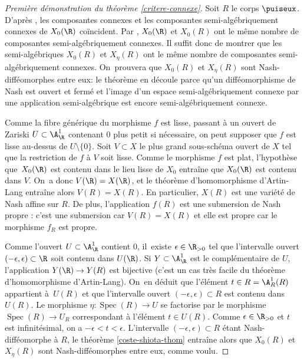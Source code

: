 \begin{proof}[Première démonstration du théorème \ref{critere-connexe}]
Soit $R$ le corps $\puiseux$. D'après \cite[Th.\,2.4.5]{bochnak1987geometrie}, les composantes connexes et les composantes semi-algébriquement connexes de $X_0(\R)$ coïncident. Par \cite[Prop.\,5.3.6]{bochnak1998real}, $X_0(\R)$ et $X_0(R)$ ont le même nombre de composantes semi-algébriquement connexes. Il suffit donc de montrer que les semi-algébriques $X_0(R)$ et $X_\eta(R)$ ont le même nombre de composantes semi-algébriquement connexes. On~prouvera que $X_0(R)$ et $X_\eta(R)$ sont Nash-difféomorphes entre eux: le théorème en découle parce qu'un difféomorphisme de Nash est ouvert et fermé et l'image d'un espace semi-algébriquement connexe par une application semi-algébrique est encore semi-algébriquement connexe.

Comme la fibre générique du morphisme $f$ est lisse, passant à un ouvert de Zariski $U\subset \A^1_{\R}$ contenant $0$ plus petit si nécessaire, on peut supposer que $f$ est lisse au-dessus de $U\setminus\{0\}$. Soit $V\subset X$ le plus grand sous-schéma ouvert de $X$ tel que la restriction de $f$ à $V$ soit lisse. Comme le morphisme $f$ est plat, l'hypothèse que~$X_0(\R)$ est contenu dans le lieu lisse de $X_0$ entraîne que $X_0(\R)$ est contenu dans $V$. On~a donc $V(\R)=X(\R)$, et le théorème d'homomorphisme d'Artin-Lang \cite[Th.\,4.1.2]{bochnak1998real} entraîne alors $V(R)=X(R)$. En particulier, $X(R)$ est une variété de Nash affine sur $R$.
De plus, l'application $f(R)$ est une submersion de Nash propre : c'est une submersion car $V(R)=X(R)$ et elle est propre car le morphisme $f_R$ est propre.

Comme l'ouvert $U\subset \A^1_{\R}$ contient $0$, il~existe $\epsilon\in \R_{>0}$ tel que l'intervalle ouvert $(-\epsilon,\epsilon)\subset \R$ soit contenu dans $U(\R)$. Si $Y\subset \A^1_{\R}$ est le complémentaire de $U$, l'appli\-cation $Y(\R)\to Y(R)$ est bijective (c'est un cas très facile du théorème d'homomorphisme d'Artin-Lang). On~en déduit que l'élément $t\in R=\A^1_R(R)$ appartient à~$U(R)$ et que l'intervalle ouvert $(-\epsilon,\epsilon)\subset R$ est contenu dans $U(R)$. Le morphisme $\eta\colon \operatorname{Spec}(R) \to U$ se factorise par le morphisme $\operatorname{Spec}(R) \to U_R$ correspondant à l'élément $t\in U(R)$. Comme $\epsilon\in \R_{>0}$ et $t$ est infinitésimal, on a $-\epsilon < t<\epsilon$. L'intervalle $(-\epsilon,\epsilon)\subset R$ étant Nash-difféomorphe à $R$, le théorème \ref{coste-shiota-thom} entraîne alors que $X_0(R)$ et $X_\eta(R)$ sont Nash-difféomorphes entre eux, comme voulu.
\end{proof}

